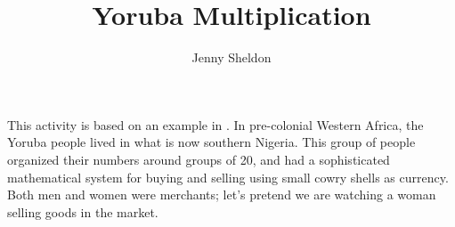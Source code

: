 \documentclass[nooutcomes, noauthor]{ximera}
\title{Yoruba Multiplication}
\author{Jenny Sheldon}
\begin{document}
\begin{abstract}

 \end{abstract}
\maketitle

This activity is based on an example in . In pre-colonial Western Africa, the Yoruba people lived in what is now southern Nigeria. This group of people organized their numbers around groups of 20, and had a sophisticated mathematical system for buying and selling using small cowry shells as currency. Both men and women were merchants; let's pretend we are watching a woman selling goods in the market.
\end{document}

